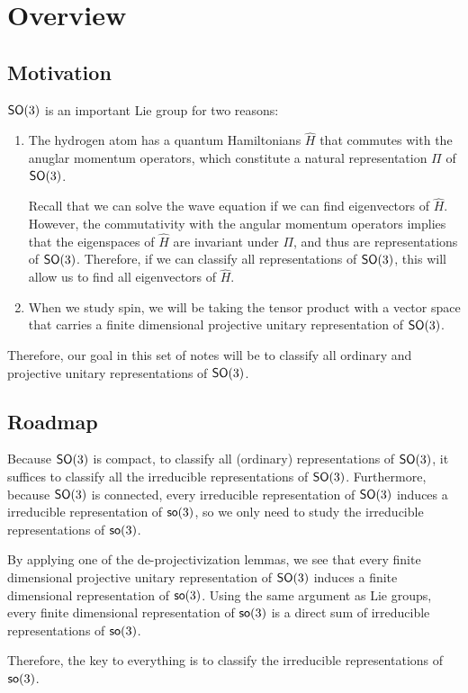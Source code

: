 \section{Overview}
\subsection{Motivation}
$\operatorname{\textsf{SO}}(3)$ is an important Lie group for two reasons:
\begin{enumerate}
    \item The hydrogen atom has a quantum Hamiltonians $\hat{H}$ that commutes with the anuglar momentum operators, which constitute a natural representation $\Pi$ of $\operatorname{\textsf{SO}}(3)$.

    Recall that we can solve the wave equation if we can find eigenvectors of $\hat{H}$. However, the commutativity with the angular momentum operators implies that the eigenspaces of $\hat{H}$ are invariant under $\Pi$, and thus are representations of $\operatorname{\textsf{SO}}(3)$. Therefore, if we can classify all representations of $\operatorname{\textsf{SO}}(3)$, this will allow us to find all eigenvectors of $\hat{H}$.

    \item  When we study spin, we will be taking the tensor product with a vector space that carries a finite dimensional projective unitary representation of $\operatorname{\textsf{SO}}(3)$.
\end{enumerate}
Therefore, our goal in this set of notes will be to classify all ordinary and projective unitary representations of $\operatorname{\textsf{SO}}(3)$.

\subsection{Roadmap}
Because $\operatorname{\textsf{SO}}(3)$ is compact, to classify all (ordinary) representations of $\operatorname{\textsf{SO}}(3)$, it suffices to classify all the irreducible representations of $\operatorname{\textsf{SO}}(3)$. Furthermore, because $\operatorname{\textsf{SO}}(3)$ is connected, every irreducible representation of $\operatorname{\textsf{SO}}(3)$ induces a irreducible representation of $\operatorname{\textsf{so}}(3)$, so we only need to study the irreducible representations of $\operatorname{\textsf{so}}(3)$.

By applying one of the de-projectivization lemmas, we see that every finite dimensional projective unitary representation of $\operatorname{\textsf{SO}}(3)$ induces a finite dimensional representation of $\operatorname{\textsf{so}}(3)$. Using the same argument as Lie groups, every finite dimensional representation of $\operatorname{\textsf{so}}(3)$ is a direct sum of irreducible representations of $\operatorname{\textsf{so}}(3)$.

Therefore, the key to everything is to classify the irreducible representations of $\operatorname{\textsf{so}}(3)$. 

